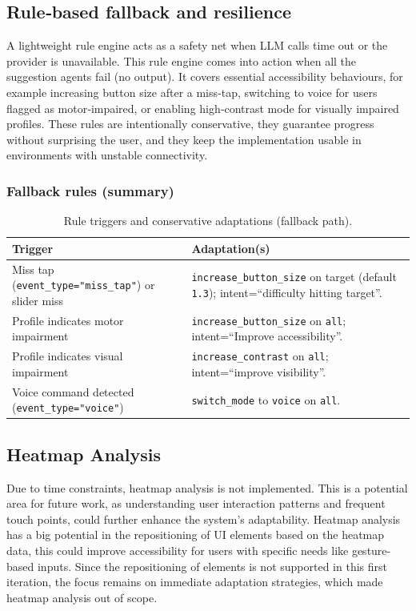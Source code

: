 \subsection{Rule‑based fallback and resilience}
A lightweight rule engine acts as a safety net when LLM calls time out or the provider is unavailable. This rule engine comes into action when all the suggestion agents fail (no output). It covers essential accessibility behaviours, for example increasing button size after a miss‑tap, switching to voice for users flagged as motor‑impaired, or enabling high‑contrast mode for visually impaired profiles. These rules are intentionally conservative, they guarantee progress without surprising the user, and they keep the implementation usable in environments with unstable connectivity.

\subsubsection*{Fallback rules (summary)}
\begin{table}[H]
\centering
\caption{Rule triggers and conservative adaptations (fallback path).}
\begin{tabular}{p{5.7cm}p{9.2cm}}
\toprule
\textbf{Trigger} & \textbf{Adaptation(s)} \\
\midrule
Miss tap (\texttt{event\_type="miss\_tap"}) or slider miss & \texttt{increase\_button\_size} on target (default \texttt{1.3}); intent=``difficulty hitting target''. \\
Profile indicates motor impairment & \texttt{increase\_button\_size} on \texttt{all}; intent=``Improve accessibility''. \\
Profile indicates visual impairment & \texttt{increase\_contrast} on \texttt{all}; intent=``improve visibility''. \\
Voice command detected (\texttt{event\_type="voice"}) & \texttt{switch\_mode} to \texttt{voice} on \texttt{all}. \\
\bottomrule
\end{tabular}
\end{table}

\subsection{Heatmap Analysis}
Due to time constraints, heatmap analysis is not implemented. This is a potential area for future work, as understanding user interaction patterns and frequent touch points, could further enhance the system's adaptability. Heatmap analysis has a big potential in the repositioning of UI elements based on the heatmap data, this could improve accessibility for users with specific needs like gesture-based inputs. Since the repositioning of elements is not supported in this first iteration, the focus remains on immediate adaptation strategies, which made heatmap analysis out of scope.

